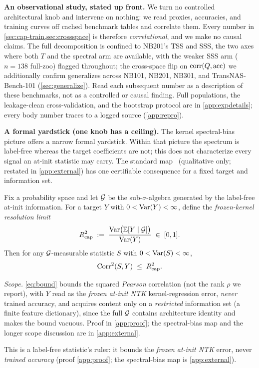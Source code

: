 \textbf{An observational study, stated up front.}
We turn no controlled architectural knob and intervene on nothing: we read
proxies, accuracies, and training curves off cached benchmark tables and
correlate them. Every number in \cref{sec:cap-train,sec:crossspace} is therefore
\emph{correlational}, and we make no causal claims. The full decomposition is
confined to NB201's TSS and SSS, the two axes where both $T$ and the spectral
arm are available, with the weaker SSS arm ($n{=}138$ full-zoo) flagged
throughout; the cross-space flip on $\operatorname{corr}(Q,\mathrm{acc})$ we additionally confirm
generalizes across NB101, NB201, NB301, and TransNAS-Bench-101
(\cref{sec:generalize}). Read each subsequent number as a description of these
benchmarks, not as a controlled or causal finding. Full populations, the
leakage-clean cross-validation, and the bootstrap protocol are in
\cref{app:expdetails}; every body number traces to a logged source
(\cref{app:repro}).

\textbf{A formal yardstick (one knob has a ceiling).}
\label{sec:theory}\label{sec:theory-map}%
The kernel spectral-bias picture offers a narrow formal yardstick. Within that
picture the spectrum is label-free whereas the target coefficients are not; this
does not characterize every signal an at-init statistic may carry. The standard
map~\cite{canatar2021spectral,bordelon2020spectrum} (qualitative only; restated in
\cref{app:external}) has one certifiable consequence for a fixed target and
information set.

\begin{proposition}
\label{thm:bound}
Fix a probability space and let $\mathcal{G}$ be the sub-$\sigma$-algebra generated by
the label-free at-init information. For a target $Y$ with $0<\operatorname{Var}(Y)<\infty$,
define the \emph{frozen-kernel resolution limit}
\begin{equation}
\label{eq:r2cap}
R^2_{\mathrm{cap}}\;:=\;\frac{\operatorname{Var}\!\big(\mathbb{E}[Y\mid\mathcal{G}]\big)}{\operatorname{Var}(Y)}\;\in\;[0,1].
\end{equation}
Then for any $\mathcal{G}$-measurable statistic $S$ with $0<\operatorname{Var}(S)<\infty$,
\begin{equation}
\label{eq:bound}
\operatorname{Corr}^2(S,Y)\;\le\;R^2_{\mathrm{cap}}.
\end{equation}
\end{proposition}
\noindent\emph{Scope.}\label{sec:theory-bound}{} \cref{eq:bound} bounds the squared \emph{Pearson}
correlation (not the rank $\rho$ we report), with $Y$ read as the \emph{frozen
at-init NTK} kernel-regression error, \emph{never} trained accuracy, and
acquires content only on a \emph{restricted} information set (a finite feature
dictionary), since the full $\mathcal{G}$ contains architecture identity and makes the
bound vacuous. Proof in \cref{app:proof}; the spectral-bias map and the longer
scope discussion are in \cref{app:external}.

\noindent
This is a label-free statistic's ruler: it bounds the \emph{frozen at-init NTK}
error, never \emph{trained accuracy} (proof \cref{app:proof}; the spectral-bias map
is \cref{app:external}).

